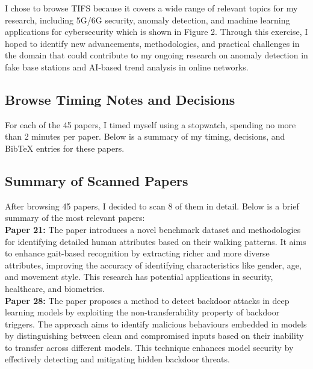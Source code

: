 \documentclass[10pt]{article}
\begin{document}
I chose to browse TIFS because it covers a wide range of relevant topics for my research, including 5G/6G security, anomaly detection, and machine learning applications for cybersecurity which is shown in Figure 2. Through this exercise, I hoped to identify new advancements, methodologies, and practical challenges in the domain that could contribute to my ongoing research on anomaly detection in fake base stations and AI-based trend analysis in online networks. 

\subsection{Browse Timing Notes and Decisions}

For each of the 45 papers, I timed myself using a stopwatch, spending no more than 2 minutes per paper. Below is a summary of my timing, decisions, and BibTeX entries for these papers.
\nocite{*}
\printbibliography[keyword={45}]

\subsection{Summary of Scanned Papers}

After browsing 45 papers, I decided to scan 8 of them in detail. Below is a brief summary of the most relevant papers:\\

\noindent\textbf{Paper 21:} The paper introduces a novel benchmark dataset and methodologies for identifying detailed human attributes based on their walking patterns. It aims to enhance gait-based recognition by extracting richer and more diverse attributes, improving the accuracy of identifying characteristics like gender, age, and movement style. This research has potential applications in security, healthcare, and biometrics.\\

\noindent\textbf{Paper 28:} The paper proposes a method to detect backdoor attacks in deep learning models by exploiting the non-transferability property of backdoor triggers. The approach aims to identify malicious behaviours embedded in models by distinguishing between clean and compromised inputs based on their inability to transfer across different models. This technique enhances model security by effectively detecting and mitigating hidden backdoor threats.\\
\end{document}
